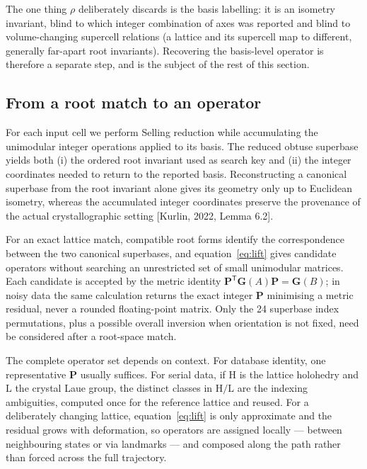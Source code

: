 \documentclass[11pt]{article}
\newcommand{\Gmet}{\mathbf{G}}
\newcommand{\Pop}{\mathbf{P}}
\newcommand{\rootinv}{\rho}
\begin{document}
The one thing $\rootinv$ deliberately discards is the basis labelling: it is an
isometry invariant, blind to which integer combination of axes was reported and
blind to volume-changing supercell relations (a lattice and its supercell map to
different, generally far-apart root invariants). Recovering the basis-level
operator is therefore a separate step, and is the subject of the rest of this
section.

\subsection{From a root match to an operator}

For each input cell we perform Selling reduction while accumulating the
unimodular integer operations applied to its basis. The reduced obtuse superbase
yields both (i) the ordered root invariant used as search key and (ii) the
integer coordinates needed to return to the reported basis. Reconstructing a
canonical superbase from the root invariant alone gives its geometry only up to
Euclidean isometry, whereas the accumulated integer coordinates preserve the
provenance of the actual crystallographic setting [Kurlin, 2022, Lemma 6.2].

For an exact lattice match, compatible root forms identify the correspondence
between the two canonical superbases, and equation~\eqref{eq:lift} gives candidate operators
without searching an unrestricted set of small unimodular matrices. Each
candidate is accepted by the metric identity
$\Pop^{\mathsf T}\Gmet(A)\Pop = \Gmet(B)$; in noisy data the same calculation
returns the exact integer $\Pop$ minimising a metric residual, never a rounded
floating-point matrix. Only the 24 superbase index permutations, plus a possible
overall inversion when orientation is not fixed, need be considered after a
root-space match.

The complete operator set depends on context. For database identity, one
representative $\Pop$ usually suffices. For serial data, if $\mathrm{H}$ is the
lattice holohedry and $\mathrm{L}$ the crystal Laue group, the distinct classes
in $\mathrm{H}/\mathrm{L}$ are the indexing ambiguities, computed once for the
reference lattice and reused. For a deliberately changing lattice, equation~\eqref{eq:lift}
is only approximate and the residual grows with deformation, so operators are
assigned locally --- between neighbouring states or via landmarks --- and
composed along the path rather than forced across the full trajectory.
\end{document}
